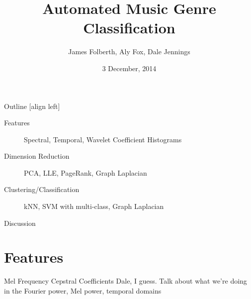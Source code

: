 \documentclass[xcolor=dvipsnames,t]{beamer} %
\title{Automated Music Genre Classification}
\date{3 December, 2014}
\author{James Folberth, Aly Fox, Dale Jennings}
\begin{document}
\begin{frame}
\maketitle
\end{frame}


\begin{frame}{Outline}
   [align left] %
   \begin{description}                              %
      \item[Features] Spectral, Temporal, Wavelet Coefficient Histograms\\
      \item[Dimension Reduction] PCA, LLE, PageRank, Graph Laplacian\\
      \item[Clustering/Classification] kNN, SVM with multi-class, Graph Laplacian\\
      \item[Discussion]
   \end{description}

\end{frame}



\section{Features}
\begin{frame}{Mel Frequency Cepstral Coefficients}
   Dale, I guess.  Talk about what we're doing in the Fourier power, Mel power, temporal domains

\end{frame}
\end{document}
